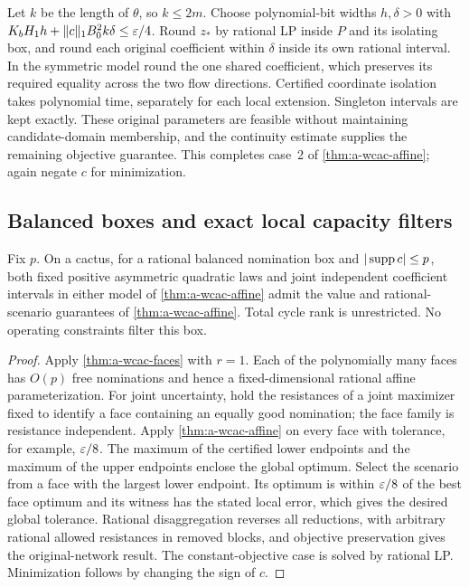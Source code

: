 Let $k$ be the length of $\theta$, so $k\le2m$. Choose polynomial-bit
widths $h,\delta>0$ with
$K_bH_1h+\|c\|_1B_0^2k\delta\le\varepsilon/4$.
Round $z_*$ by rational LP inside $P$ and its isolating box, and round each
original coefficient within $\delta$ inside its own rational interval.
In the symmetric model round the one shared coefficient, which preserves
its required equality across the two flow directions. Certified
coordinate isolation takes polynomial time, separately for each local
extension. Singleton intervals are kept exactly. These original
parameters are feasible without maintaining candidate-domain membership,
and the continuity estimate supplies the remaining objective guarantee.
This completes case~2 of \cref{thm:a-wcac-affine}; again negate $c$ for
minimization.

\subsection{Balanced boxes and exact local capacity filters}

\begin{corollary}
\label{cor:a-wcac-box}
Fix $p$. On a cactus, for a rational balanced nomination box and
$|\operatorname{supp} c|\le p$, both fixed positive asymmetric quadratic laws and joint
independent coefficient intervals in either model of
\cref{thm:a-wcac-affine} admit the value and
rational-scenario guarantees of \cref{thm:a-wcac-affine}. Total cycle rank
is unrestricted. No operating constraints filter this box.
\end{corollary}
\begin{proof}
Apply \cref{thm:a-wcac-faces} with $r=1$. Each of the polynomially many
faces has $O(p)$ free nominations and hence a fixed-dimensional rational
affine parameterization. For joint uncertainty, hold the resistances of a
joint maximizer fixed to identify a face containing an equally good
nomination; the face family is resistance independent. Apply
\cref{thm:a-wcac-affine} on every face with tolerance, for example,
$\varepsilon/8$. The maximum of the certified lower endpoints and the maximum of
the upper endpoints enclose the global optimum. Select the scenario
from a face with the largest lower endpoint. Its optimum is within
$\varepsilon/8$ of the best face optimum and its witness has the stated local
error, which gives the desired global tolerance. Rational disaggregation
reverses all reductions, with arbitrary rational allowed resistances in
removed blocks, and objective preservation gives the original-network
result. The constant-objective case is solved by rational LP. Minimization
follows by changing the sign of $c$.
\end{proof}

